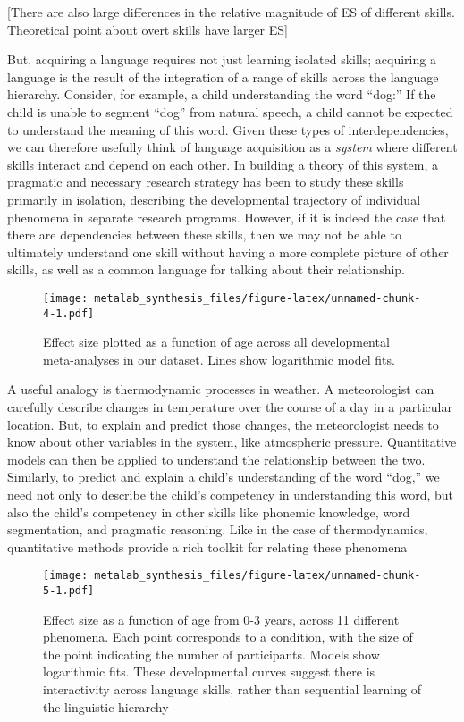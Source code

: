 \documentclass[english,floatsintext,man]{apa6}
\begin{document}
{[}There are also large differences in the relative magnitude of ES of
different skills. Theoretical point about overt skills have larger ES{]}

But, acquiring a language requires not just learning isolated skills;
acquiring a language is the result of the integration of a range of
skills across the language hierarchy. Consider, for example, a child
understanding the word \enquote{dog:} If the child is unable to segment
\enquote{dog} from natural speech, a child cannot be expected to
understand the meaning of this word. Given these types of
interdependencies, we can therefore usefully think of language
acquisition as a \emph{system} where different skills interact and
depend on each other. In building a theory of this system, a pragmatic
and necessary research strategy has been to study these skills primarily
in isolation, describing the developmental trajectory of individual
phenomena in separate research programs. However, if it is indeed the
case that there are dependencies between these skills, then we may not
be able to ultimately understand one skill without having a more
complete picture of other skills, as well as a common language for
talking about their relationship.

\begin{figure}[htbp]
\centering
\texttt{[image: metalab\_synthesis\_files/figure-latex/unnamed-chunk-4-1.pdf]}
\caption{Effect size plotted as a function of age across all
developmental meta-analyses in our dataset. Lines show logarithmic model
fits.}
\end{figure}

A useful analogy is thermodynamic processes in weather. A meteorologist
can carefully describe changes in temperature over the course of a day
in a particular location. But, to explain and predict those changes, the
meteorologist needs to know about other variables in the system, like
atmospheric pressure. Quantitative models can then be applied to
understand the relationship between the two. Similarly, to predict and
explain a child's understanding of the word \enquote{dog,} we need not
only to describe the child's competency in understanding this word, but
also the child's competency in other skills like phonemic knowledge,
word segmentation, and pragmatic reasoning. Like in the case of
thermodynamics, quantitative methods provide a rich toolkit for relating
these phenomena

\begin{figure}[htbp]
\centering
\texttt{[image: metalab\_synthesis\_files/figure-latex/unnamed-chunk-5-1.pdf]}
\caption{Effect size as a function of age from 0-3 years, across 11
different phenomena. Each point corresponds to a condition, with the
size of the point indicating the number of participants. Models show
logarithmic fits. These developmental curves suggest there is
interactivity across language skills, rather than sequential learning of
the linguistic hierarchy}
\end{figure}
\end{document}
